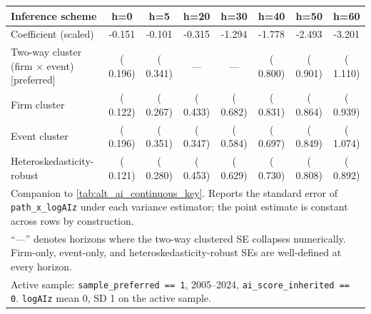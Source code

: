 \begin{tabular}{lccccccc}\hline\hline
Inference scheme & h=0 & h=5 & h=20 & h=30 & h=40 & h=50 & h=60 \\
\hline
Coefficient (scaled) & -0.151 & -0.101 & -0.315 & -1.294 & -1.778 & -2.493 & -3.201 \\
\hline
Two-way cluster (firm $\times$ event) [preferred] & ( 0.196) & ( 0.341) & --- & --- & ( 0.800) & ( 0.901) & ( 1.110) \\
Firm cluster & ( 0.122) & ( 0.267) & ( 0.433) & ( 0.682) & ( 0.831) & ( 0.864) & ( 0.939) \\
Event cluster & ( 0.196) & ( 0.351) & ( 0.347) & ( 0.584) & ( 0.697) & ( 0.849) & ( 1.074) \\
Heteroskedasticity-robust & ( 0.121) & ( 0.280) & ( 0.453) & ( 0.629) & ( 0.730) & ( 0.808) & ( 0.892) \\
\hline\hline
\multicolumn{8}{l}{\footnotesize Companion to \cref{tab:alt_ai_continuous_key}. Reports the standard error of \texttt{path\_x\_logAIz} under each variance estimator; the point estimate is constant across rows by construction.} \\
\multicolumn{8}{l}{\footnotesize ``---'' denotes horizons where the two-way clustered SE collapses numerically. Firm-only, event-only, and heteroskedasticity-robust SEs are well-defined at every horizon.} \\
\multicolumn{8}{l}{\footnotesize Active sample: \texttt{sample\_preferred == 1}, 2005--2024, \texttt{ai\_score\_inherited == 0}. \texttt{logAIz} mean 0, SD 1 on the active sample.} \\
\end{tabular}
